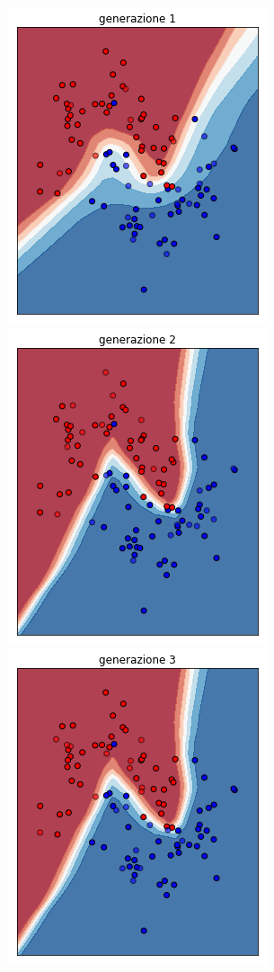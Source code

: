 \documentclass[12pt,a4paper]{report}
\begin{document}
\begin{figure}[H]
 \centering
 \includegraphics[scale = 0.37]{images/moons-rnd-log./1}
 \includegraphics[scale = 0.37]{images/moons-rnd-log./2}
 \\
 \includegraphics[scale = 0.37]{images/moons-rnd-log./3}

\end{figure}
\end{document}
